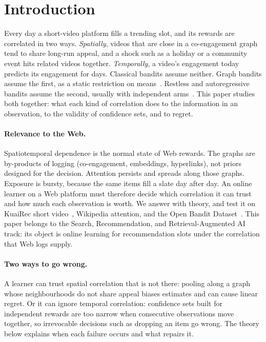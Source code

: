 \documentclass[sigconf,review,anonymous]{acmart}
\begin{document}
\maketitle

\section{Introduction}

Every day a short-video platform fills a trending slot, and its rewards are correlated in two ways. \emph{Spatially}, videos that are close in a co-engagement graph tend to share long-run appeal, and a shock such as a holiday or a community event hits related videos together. \emph{Temporally}, a video's engagement today predicts its engagement for days. Classical bandits assume neither. Graph bandits assume the first, as a static restriction on means~\cite{valko2014spectral,ban2021local}. Restless and autoregressive bandits assume the second, usually with independent arms~\cite{chen2023autoregressive,trella2025latent}. This paper studies both together: what each kind of correlation does to the information in an observation, to the validity of confidence sets, and to regret.

\paragraph{Relevance to the Web.} Spatiotemporal dependence is the normal state of Web rewards. The graphs are by-products of logging (co-engagement, embeddings, hyperlinks), not priors designed for the decision. Attention persists and spreads along those graphs. Exposure is bursty, because the same items fill a slate day after day. An online learner on a Web platform must therefore decide which correlation it can trust and how much each observation is worth. We answer with theory, and test it on KuaiRec short video~\cite{gao2022kuairec}, Wikipedia attention, and the Open Bandit Dataset~\cite{saito2021obd}. This paper belongs to the Search, Recommendation, and Retrieval-Augmented AI track: its object is online learning for recommendation slots under the correlation that Web logs supply.

\paragraph{Two ways to go wrong.} A learner can trust spatial correlation that is not there: pooling along a graph whose neighbourhoods do not share appeal biases estimates and can cause linear regret. Or it can ignore temporal correlation: confidence sets built for independent rewards are too narrow when consecutive observations move together, so irrevocable decisions such as dropping an item go wrong. The theory below explains when each failure occurs and what repairs it.
\end{document}
